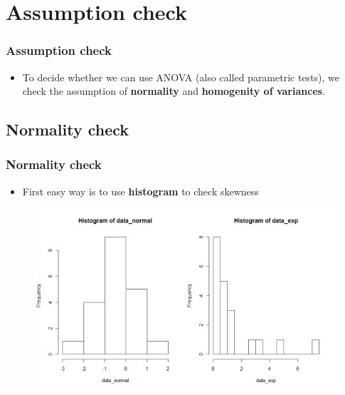 \documentclass{beamer}
\begin{document}
\section{Assumption check} %

\begin{frame}
	\frametitle{Assumption check} 
	\begin{itemize}
		\item To decide whether we can use ANOVA (also called parametric tests), we check the assumption of \textbf{normality} and \textbf{homogenity of variances}.  %
	\end{itemize}
\end{frame}

\subsection{Normality check}

\begin{frame}
	\frametitle{Normality check} 
	\begin{itemize}
		\item First easy way is to use \textbf{histogram} to check skewness
	\end{itemize}
	\begin{figure}
		\includegraphics[width=0.8\linewidth]{histogram}
	\end{figure}
\end{frame}
\end{document}
